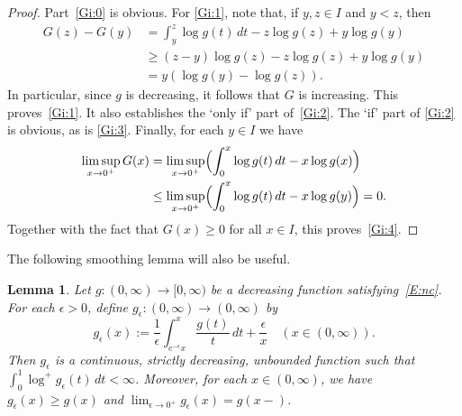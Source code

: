 \documentclass[11pt,reqno]{amsart}
\theoremstyle{plain}
\newtheorem{lemma}[theorem]{Lemma}
\theoremstyle{definition}
\theoremstyle{remark}
\begin{document}
\begin{proof}
Part~\eqref{Gi:0} is obvious. For \eqref{Gi:1}, note that,
if $y,z\in I$ and $y<z$, then
\begin{equation}\label{E:Gineq}
\begin{aligned}
G(z)-G(y)&=\int_y^z \log g(t)\,dt -z\log g(z)+y\log g(y)\\
&\ge (z-y)\log g(z)-z\log g(z)+y\log g(y)\\
&=y(\log g(y)-\log g(z)).
\end{aligned}
\end{equation}
In particular, since $g$ is decreasing, it follows that $G$
is increasing. This proves~\eqref{Gi:1}. It also establishes the `only if'
part of~\eqref{Gi:2}. The `if' part of \eqref{Gi:2} is obvious, as is \eqref{Gi:3}. Finally, 
for each $y\in I$ we have
\begin{align*}
\limsup_{x\to0^+}G(x)
&=\limsup_{x\to0^+}\Bigl(\int_0^x\log g(t)\,dt-x\log g(x)\Bigr)\\
&\le \limsup_{x\to0^+}\Bigl(\int_0^x\log g(t)\,dt-x\log g(y)\Bigr)
=0.
\end{align*}
Together with the fact that $G(x)\ge0$ for all $x\in I$,
this proves~\eqref{Gi:4}. 
\end{proof}

The following smoothing lemma will also be useful.

\begin{lemma}\label{L:smoothing}
Let $g:(0,\infty)\to[0,\infty)$ be a decreasing function
satisfying~\eqref{E:nc}.
For each $\epsilon>0$, define
$g_\epsilon:(0,\infty)\to(0,\infty)$ by
\[
g_\epsilon(x):=\frac{1}{\epsilon}\int_{e^{-\epsilon}x}^x \frac{g(t)}{t}\,dt+\frac{\epsilon}{x} \quad(x\in(0,\infty)).
\]
Then $g_\epsilon$ is a continuous, strictly decreasing,
unbounded function
such that $\int_0^1 \log^+g_\epsilon(t)\,dt<\infty$.
Moreover, for each $x\in(0,\infty)$,
we have  $g_\epsilon(x)\ge g(x)$
and $\lim_{\epsilon\to0^+}g_\epsilon(x)=g(x-)$.
\end{lemma}
\end{document}
